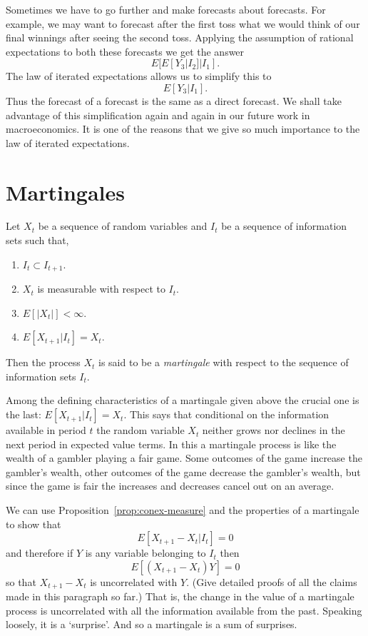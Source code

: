 \documentclass[12pt,reqno,openany]{amsbook}
\theoremstyle{plain}
\theoremstyle{definition}
\newcommand{\newterm}[1]{\emph{#1}}
\begin{document}
Sometimes we have to go further and make forecasts about forecasts.
For example, we may want to forecast after the first toss what we
would think of our final winnings after seeing the second toss.
Applying the assumption of rational expectations to both these
forecasts we get the answer
\[E[E[Y_3|I_2]|I_1].\]
The law of iterated expectations allows us to simplify this to
\[E[Y_3|I_1].\]
Thus the forecast of a forecast is the same as a direct forecast. We
shall take advantage of this simplification again and again in our
future work in macroeconomics. It is one of the reasons that we give
so much importance to the law of iterated expectations.

\section{Martingales}
Let $X_t$ be a sequence of random variables and $I_t$ be a sequence of
information sets such that,
\begin{enumerate}
\item $I_t \subset I_{t+1}$.
\item $X_t$ is measurable with respect to $I_t$.
\item $E[|X_t|]<\infty$.
\item $E[X_{t+1}|I_t]=X_t$.
\end{enumerate}
Then the process $X_t$ is said to be a \newterm{martingale} with
respect to the sequence of information sets $I_t$.

Among the defining characteristics of a martingale given above the
crucial one is the last: $E[X_{t+1}|I_t]=X_t$. This says that
conditional on the information available in period $t$ the random
variable $X_t$ neither grows nor declines in the next period in
expected value terms. In this a martingale process is like the wealth
of a gambler playing a fair game. Some outcomes of the game increase
the gambler's wealth, other outcomes of the game decrease the
gambler's wealth, but since the game is fair the increases and
decreases cancel out on an average.

We can use Proposition~\ref{prop:conex-measure} and the properties of
a martingale to show that
\[E[X_{t+1}-X_t|I_t]=0\]
and therefore if $Y$ is any variable belonging to $I_t$ then
\[E[(X_{t+1}-X_{t})Y]=0\]
so that $X_{t+1}-X_t$ is uncorrelated with $Y$. (Give detailed proofs
of all the claims made in this paragraph so far.) That is, the change
in the value of a martingale process is uncorrelated with all the
information available from the past. Speaking loosely, it is a
`surprise'. And so a martingale is a sum of surprises.
\end{document}

